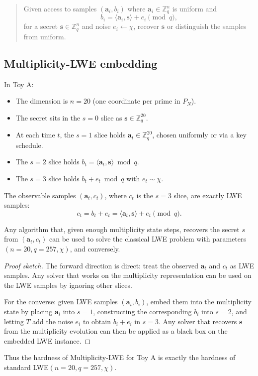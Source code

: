 \documentclass[11pt]{article}
\begin{document}
\begin{quote}
Given access to samples $(\mathbf{a}_i, b_i)$ where
$\mathbf{a}_i \in \mathbb{Z}_q^n$ is uniform and
\[
b_i = \langle \mathbf{a}_i, \mathbf{s} \rangle + e_i \pmod{q},
\]
for a secret $\mathbf{s} \in \mathbb{Z}_q^n$ and noise $e_i \leftarrow \chi$,
recover $\mathbf{s}$ or distinguish the samples from uniform.
\end{quote}

\subsection{Multiplicity-LWE embedding}

In Toy A:

\begin{itemize}
    \item The dimension is $n=20$ (one coordinate per prime in $P_N$).
    \item The secret sits in the $s=0$ slice as $\mathbf{s} \in \mathbb{Z}_q^{20}$.
    \item At each time $t$, the $s=1$ slice holds $\mathbf{a}_t\in\mathbb{Z}_q^{20}$,
    chosen uniformly or via a key schedule.
    \item The $s=2$ slice holds $b_t = \langle \mathbf{a}_t, \mathbf{s} \rangle \bmod q$.
    \item The $s=3$ slice holds $b_t + e_t \bmod q$ with $e_t\sim\chi$.
\end{itemize}

The observable samples $(\mathbf{a}_t, c_t)$, where $c_t$ is the $s=3$ slice,
are exactly LWE samples:
\[
c_t = b_t + e_t
= \langle \mathbf{a}_t, \mathbf{s} \rangle + e_t \pmod{q}.
\]

\begin{lemma}
Any algorithm that, given enough multiplicity state steps, recovers the secret
$s$ from $(\mathbf{a}_t, c_t)$ can be used to solve the classical LWE problem
with parameters $(n=20, q=257, \chi)$, and conversely.
\end{lemma}

\begin{proof}[Proof sketch]
The forward direction is direct: treat the observed $\mathbf{a}_t$ and $c_t$
as LWE samples. Any solver that works on the multiplicity representation
can be used on the LWE samples by ignoring other slices.

For the converse: given LWE samples $(\mathbf{a}_i,b_i)$, embed them into the
multiplicity state by placing $\mathbf{a}_i$ into $s=1$, constructing the
corresponding $b_i$ into $s=2$, and letting $T$ add the noise $e_i$ to obtain
$b_i+e_i$ in $s=3$. Any solver that recovers $\mathbf{s}$ from the multiplicity
evolution can then be applied as a black box on the embedded LWE instance.
\end{proof}

Thus the hardness of Multiplicity-LWE for Toy A is exactly the hardness of
standard LWE$(n=20,q=257,\chi)$.

\nocite{*}
  

\end{document}
